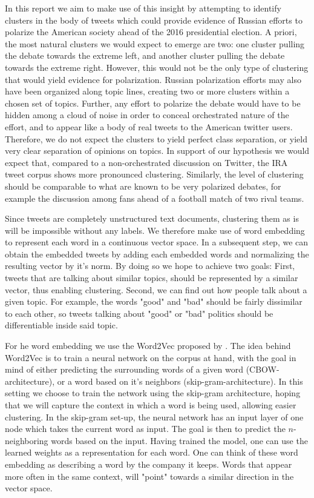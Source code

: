 \documentclass[12pt, authoryear]{elsarticle}
\begin{document}
In this report we aim to make use of this insight by attempting to identify clusters in the body of tweets which could provide evidence of Russian efforts to polarize the American society ahead of the 2016 presidential election. A priori, the most natural clusters we would expect to emerge are two: one cluster pulling the debate towards the extreme left, and another cluster pulling the debate towards the extreme right. However, this would not be the only type of clustering that would yield evidence for polarization. Russian polarization efforts may also have been organized along topic lines, creating two or more clusters within a chosen set of topics. Further, any effort to polarize the debate would have to be hidden among a cloud of noise in order to conceal orchestrated nature of the effort, and to appear like a body of real tweets to the American twitter users. Therefore, we do not expect the clusters to yield perfect class separation, or yield very clear separation of opinions on topics. In support of our hypothesis we would expect that, compared to a non-orchestrated discussion on Twitter, the IRA tweet corpus shows more pronounced clustering. Similarly, the level of clustering should be comparable to what are known to be very polarized debates, for example the discussion among fans ahead of a football match of two rival teams.

Since tweets are completely unstructured text documents, clustering them as is will be impossible without any labels. We therefore make use of word embedding to represent each word in a continuous vector space. In a subsequent step, we can obtain the embedded tweets by adding each embedded words and normalizing the resulting vector by it's norm. By doing so we hope to achieve two goals: First, tweets that are talking about similar topics, should be represented by a similar vector, thus enabling clustering. Second, we can find out how people talk about a given topic. For example, the words "good" and "bad" should be fairly dissimilar to each other, so tweets talking about "good" or "bad" politics should be differentiable inside said topic.

For he word embedding we use the Word2Vec proposed by \cite{mikolov2013efficient}. The idea behind Word2Vec is to train a neural network on the corpus at hand, with the goal in mind of either predicting the surrounding words of a given word (CBOW-architecture), or a word based on it's neighbors (skip-gram-architecture). In this setting we choose to train the network using the skip-gram architecture, hoping that we will capture the context in which a word is being used, allowing easier clustering. In the skip-gram set-up, the neural network has an input layer of one node which takes the current word as input. The goal is then to predict the $n$- neighboring words based on the input. Having trained the model, one can use the learned weights as a representation for each word. One can think of these word embedding as describing a word by the company it keeps. Words that appear more often in the same context, will "point" towards a similar direction in the vector space.
\end{document}
